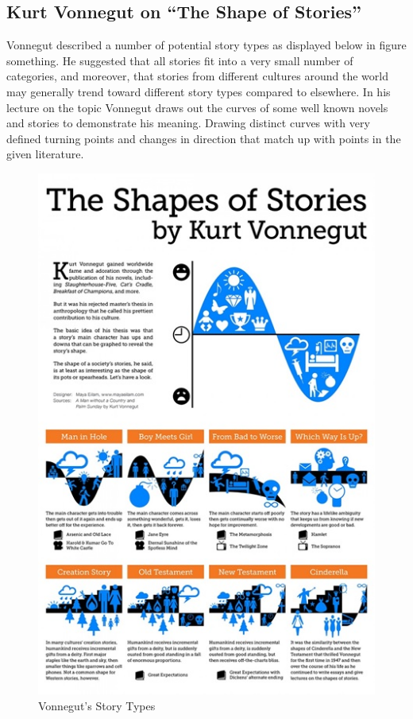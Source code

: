 \documentclass{article}
\begin{document}
    \subsection{Kurt Vonnegut on ``The Shape of Stories''}
        Vonnegut described a number of potential story types as displayed below in figure something. He suggested that all stories fit into a very small number of categories, and moreover, that stories from different cultures around the world may generally trend toward different story types compared to elsewhere. In his lecture on the topic Vonnegut draws out the curves of some well known novels and stories to demonstrate his meaning. Drawing distinct curves with very defined turning points and changes in direction that match up with points in the given literature.
        \begin{figure}
            \centering
            \includegraphics{Misc/VonnegutShapes}
            \caption{Vonnegut's Story Types}
            \label{fig:storyTypes}
        \end{figure}
\end{document}
